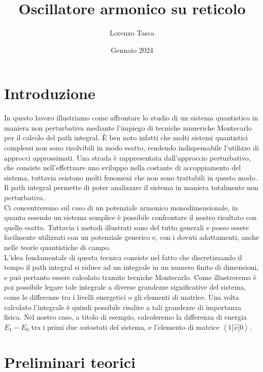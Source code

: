 \documentclass{article}
\begin{document}
\title{Oscillatore armonico su reticolo}
\author{Lorenzo Tasca}
\date{Gennaio 2024}
\maketitle


\tableofcontents
\newpage
\section{Introduzione}
In questo lavoro illustriamo come affrontare lo studio di un sistema quantistico in maniera non perturbativa mediante l'impiego di tecniche numeriche Montecarlo per il calcolo del path integral. È ben noto infatti che molti sistemi quantistici complessi non sono risolvibili in modo esatto, rendendo indispensabile l'utilizzo di approcci approssimati. Una strada è rappresentata dall'approccio perturbativo, che consiste nell'effettuare uno sviluppo nella costante di accoppiamento del sistema, tuttavia esistono molti fenomeni che non sono trattabili in questo modo. Il path integral permette di poter analizzare il sistema in maniera totalmente non perturbativa. \\Ci concentreremo sul caso di un potenziale armonico monodimensionale, in quanto essendo un sistema semplice è possibile confrontare il nostro risultato con quello esatto. Tuttavia i metodi illustrati sono del tutto generali e posso essere facilmente utilizzati con un potenziale generico e, con i dovuti adattamenti, anche nelle teorie quantistiche di campo. \\
L'idea fondamentale di questa tecnica consiste nel fatto che discretizzando il tempo il path integral si riduce ad un integrale in un numero finito di dimensioni, e può pertanto essere calcolato tramite tecniche Montecarlo. Come illustreremo è poi possibile legare tale integrale a diverse grandezze significative del sistema, come le differenze tra i livelli energetici o gli elementi di matrice. Una volta calcolato l'integrale è quindi possibile risalire a tali grandezze di importanza fisica. Nel nostro caso, a titolo di esempio, calcoleremo la differenza di energia $E_1-E_0$ tra i primi due autostati del sistema, e l'elemento di matrice $\left<1|\hat{x}|0\right>$.






\section{Preliminari teorici}
\end{document}
